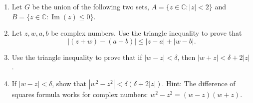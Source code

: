 \documentclass[11pt]{article}
\newcommand{\C}{\mathbb{C}}
\newcommand{\im}{\operatorname{Im}}
\begin{document}
\noindent
\begin{enumerate}
\setcounter{enumi}{\theenumCount}
\item Let $G$ be the union of the following two sets, $A= \{ z \in \C :  |z| < 2 \}$ and $B=\{z \in \C : \im(z) \le 0 \}$. 


\newpage

\item Let $z, w, a, b$ be complex numbers.  Use the triangle inequality to prove that 
$$| (z+w) - (a+b) | \le | z-a | + | w - b |.$$
\vfill
\vfill

\item Use the triangle inequality to prove that if $|w- z| < \delta$, then $|w+z| < \delta + 2|z|$.
\vfill
\vfill

\item If $|w - z| < \delta$, show that $|w^2 - z^2 | < \delta (\delta + 2|z|)$. Hint: The difference of squares formula works for complex numbers: $w^2-z^2 = (w-z)(w+z)$.
\vfill
\vfill



\setcounter{enumCount}{\theenumi}
\end{enumerate}
\end{document}
